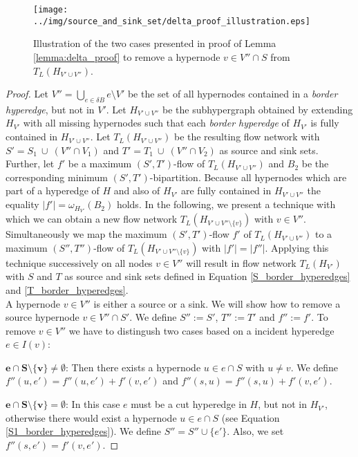 \begin{figure}
\centering
\texttt{[image: ../img/source\_and\_sink\_set/delta\_proof\_illustration.eps]}
\caption{Illustration of the two cases presented in proof of Lemma \ref{lemma:delta_proof}
         to remove a hypernode $v \in V'' \cap S$ from $T_L(H_{V' \cup V''})$. }
\label{img:delta_proof_illustration}
\end{figure}

\begin{proof}
Let $V'' = \bigcup_{e \in \delta B} e \setminus V'$ be the set of all hypernodes contained
in a \emph{border hyperedge}, but not in $V'$. Let $H_{V' \cup V''}$ be the subhypergraph
obtained by extending $H_{V'}$ with all missing hypernodes such that 
each \emph{border hyperedge} of $H_{V'}$ is fully contained in $H_{V'\cup V''}$. 
Let $T_L(H_{V' \cup V''})$ be the resulting flow network with $S' = S_1\ \cup\ (V'' \cap V_1)$ and 
$T' = T_1\ \cup\ (V'' \cap V_2)$ as source and sink sets. Further, let $f'$ be a maximum $(S',T')$-flow 
of $T_L(H_{V' \cup V''})$ and $B_2$ be the corresponding minimum $(S',T')$-bipartition. Because
all hypernodes which are part of a hyperedge of $H$ and also of $H_{V'}$ are fully contained
in $H_{V' \cup V''}$ the equality $|f'| = \omega_{H_{V'}}(B_2)$ holds. In the following, we 
present a technique with which we can obtain a new flow network $T_L(H_{V' \cup V''\setminus \{v\}})$
with $v \in V''$. Simultaneously we map
the maximum $(S',T')$-flow $f'$ of $T_L(H_{V' \cup V''})$ to a maximum $(S'',T'')$-flow
of $T_L(H_{V' \cup V''\setminus \{v\}})$ with $|f'| = |f''|$. Applying this technique successively
on all nodes $v \in V''$ will result in flow network $T_L(H_{V'})$ with $S$ and $T$ as source and sink sets
defined in Equation \ref{S_border_hyperedges} and \ref{T_border_hyperedges}. \\
A hypernode $v \in V''$ is either a source or a sink. We will show how to remove a source
hypernode $v \in V'' \cap S'$. We define $S'' := S'$, $T'' := T'$ and 
$f'' := f'$. To remove $v \in V''$ we have to distingush two cases 
based on a incident hyperedge $e \in I(v)$: 

$\mathbf{e \cap S \setminus \{v\} \neq \emptyset}$:
Then there exists a hypernode $u \in e \cap S$ with $u \neq v$. We define
$f''(u,e') = f''(u,e') + f'(v,e')$ and $f''(s,u) = f''(s,u) + f'(v,e')$. 

$\mathbf{e \cap S \setminus \{v\} = \emptyset}$:
In this case $e$ must be a cut hyperedge in $H$, but not in $H_{V'}$, otherwise
there would exist a hypernode $u \in e \cap S$ (see Equation \ref{S1_border_hyperedges}).
We define $S'' = S'' \cup \{e'\}$. Also, we set $f''(s,e') = f'(v,e')$. 


\end{proof}
